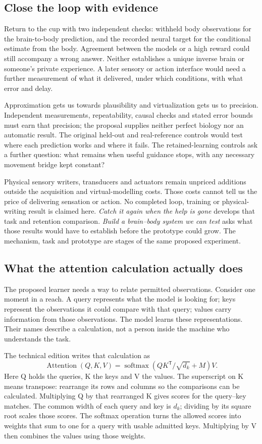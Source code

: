 \subsection{Close the loop with evidence}
Return to the cup with two independent checks: withheld body observations
for the brain-to-body prediction, and the recorded neural target for the
conditional estimate from the body. Agreement between the models or a high
reward could still accompany a wrong answer. Neither establishes a unique
inverse brain or someone's private experience. A later sensory or action
interface would need a further measurement of what it delivered, under which
conditions, with what error and delay.

Approximation gets us towards plausibility and virtualization gets us to
precision. Independent measurements, repeatability, causal checks and stated
error bounds must earn that precision; the proposal supplies neither perfect
biology nor an automatic result. The original held-out and real-reference
controls would test where each prediction works and where it fails. The
retained-learning controls ask a further question: what remains when useful
guidance stops, with any necessary movement bridge kept constant?

Physical sensory writers, transducers and actuators remain unpriced additions
outside the acquisition and virtual-modelling costs. Those costs cannot tell us
the price of delivering sensation or action. No completed loop, training or
physical-writing result is claimed here. \emph{Catch it again when the help is
gone} develops that task and retention comparison. \emph{Build a brain--body
system we can test} asks what those results would have to establish before the
prototype could grow. The mechanism, task and prototype are stages of the same
proposed experiment.

\subsection{What the attention calculation actually does}

The proposed learner needs a way to relate permitted observations. Consider
one moment in a reach. A query represents what the model is looking for;
keys represent the observations it could compare with that query; values
carry information from those observations. The model learns these
representations. Their names describe a calculation, not a person inside the
machine who understands the task.

The technical edition writes that calculation as
\[\operatorname{Attention}(Q,K,V)=\operatorname{softmax}\!\left(QK^{\mathsf{T}}/\sqrt{d_k}+M\right)V.\]
Here Q holds the queries, K the keys and V the values. The superscript on K
means transpose: rearrange its rows and columns so the comparisons can be
calculated. Multiplying Q by that rearranged K gives scores for the
query--key matches. The common width of each query and key is $d_k$; dividing
by its square root scales those scores. The softmax operation turns the
allowed scores into weights that sum to one for a query with usable admitted
keys. Multiplying by V then combines the values using those weights.

